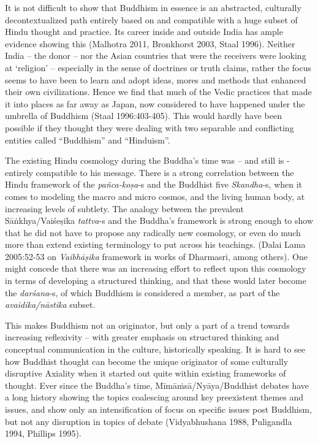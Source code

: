 It is not difficult to show that Buddhism in essence is an abstracted, culturally decontextualized path entirely based on and compatible with a huge subset of Hindu thought and practice. Its career inside and outside India has ample evidence showing this (Malhotra 2011, Bronkhorst 2003, Staal 1996). Neither India – the donor – nor the Asian countries that were the receivers were looking at ‘religion’ – especially in the sense of doctrines or truth claims, rather the focus seems to have been to learn and adopt ideas, mores and methods that enhanced their own civilizations. Hence we find that much of the Vedic practices that made it into places as far away as Japan, now considered to have happened under the umbrella of Buddhism (Staal 1996:403-405). This would hardly have been possible if they thought they were dealing with two separable and conflicting entities called “Buddhism” and “Hinduism”.

The existing Hindu cosmology during the Buddha’s time was – and still is - entirely compatible to his message. There is a strong correlation between the Hindu framework of the \textit{pañca-koṣa}-s and the Buddhist five \textit{Skandha}-s, when it comes to modeling the macro and micro cosmos, and the living human body, at increasing levels of subtlety. The analogy between the prevalent Sāṅkhya/Vaiśeṣika \textit{tattva}-s and the Buddha’s framework is strong enough to show that he did not have to propose any radically new cosmology, or even do much more than extend existing terminology to put across his teachings. (Dalai Lama 2005:52-53 on \textit{Vaibhāṣika} framework in works of Dharmasri, among others). One might concede that there was an increasing effort to reflect upon this cosmology in terms of developing a structured thinking, and that these would later become the \textit{darśana}-s, of which Buddhism is considered a member, as part of the \textit{avaidika/nāstika} subset.

This makes Buddhism not an originator, but only a part of a trend towards increasing reflexivity – with greater emphasis on structured thinking and conceptual communication in the culture, historically speaking. It is hard to see how Buddhist thought can become the unique originator of some culturally disruptive Axiality when it started out quite within existing frameworks of thought. Ever since the Buddha’s time, Mīmāṁsā/Nyāya/Buddhist debates have a long history showing the topics coalescing around key preexistent themes and issues, and show only an intensification of focus on specific issues post Buddhism, but not any disruption in topics of debate (Vidyabhushana 1988, Puligandla 1994, Phillips 1995).

